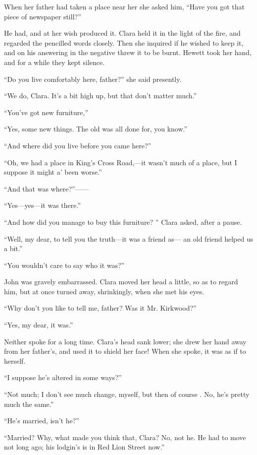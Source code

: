 When her father had taken a place near her
{\protect\hypertarget{302}{}{}}she asked him, ``Have you got that piece
of newspaper still?''

He had, and at her wish produced it. Clara held it in the light of the
fire, and regarded the pencilled words closely. Then she inquired if he
wished to keep it, and on his answering in the negative threw it to be
burnt. Hewett took her hand, and for a while they kept silence.

``Do you live comfortably here, father?'' she said presently.

``We do, Clara. It's a bit high up, but that don't matter much.''

``You've got new furniture,''

``Yes, some new things. The old was all done for, you know.''

``And where did you live before you came here?''

``Oh, we had a place in King's Cross Road,---it wasn't much of a place,
but I suppose it might a' been worse.''

``And that was where?''{{------}}

``Yes---yes---it was there.''

``And how did you manage to buy this furniture? '' Clara asked, after a
pause.

{\protect\hypertarget{303}{}{}}``Well, my dear, to tell you the
truth---it was a friend as--- an old friend helped us a bit.''

``You wouldn't care to say who it was?''

John was gravely embarrassed. Clara moved her head a little, so as to
regard him, but at once turned away, shrinkingly, when she met his eyes.

``Why don't you like to tell me, father? Was it Mr. Kirkwood?''

``Yes, my dear, it was.''

Neither spoke for a long time. Clara's head sank lower; she drew her
hand away from her father's, and used it to shield her face! When she
spoke, it was as if to herself.

``I suppose he's altered in some ways?''

``Not much; I don't see much change, myself, but then of course . No,
he's pretty much the same.''

``He's married, isn't he?''

``Married? Why, what made you think that, Clara? No, not he. He had to
move not long ago; his lodgin's is in Red Lion Street now.''

